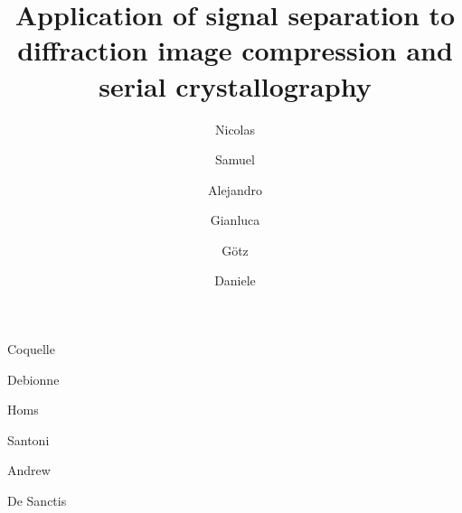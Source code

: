 \documentclass[preprint]{iucr}              %
\begin{document}



\title{Application of signal separation to diffraction image compression and serial crystallography}


\author[a]{Nicolas}{Coquelle}
\author[a]{Samuel}{Debionne}
\author[a]{Alejandro}{Homs}
\author[a]{Gianluca}{Santoni}
\author[a]{Götz}{Andrew}
\author[a]{Daniele}{De Sanctis}









\end{document}
